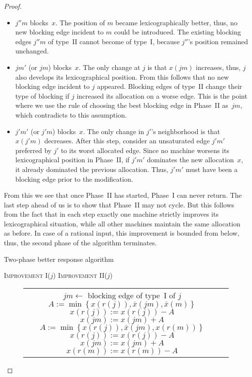 \documentclass{llncs}
\begin{document}
\begin{proof}
\begin{itemize}
	\item $j''m$ blocks~$x$. The position of $m$ became lexicographically better, thus, no new blocking edge incident to $m$ could be introduced. The existing blocking edges $j''m$ of type~II cannot become of type~I, because $j''$'s position remained unchanged.
	\item $jm'$ (or $jm$) blocks~$x$. The only change at $j$ is that $x(jm)$ increases, thus, $j$ also develops its  lexicographical position. From this follows that no new blocking edge incident to $j$ appeared. Blocking edges of type~II change their type of blocking if $j$ increased its allocation on a worse edge. This is the point where we use the rule of choosing the best blocking edge in Phase~II as~$jm$, which contradicts to this assumption.
	\item $j'm'$ (or $j'm$) blocks~$x$. The only change in $j'$'s neighborhood is that $x(j'm)$ decreases. After this step, consider an unsaturated edge $j'm'$ preferred by $j'$ to its worst allocated edge. Since no machine worsens its lexicographical position in Phase~II, if $j'm'$ dominates the new allocation~$x$, it already dominated the previous allocation. Thus, $j'm'$ must have been a blocking edge prior to the modification.  
\end{itemize}

From this we see that once Phase~II has started, Phase~I can never return. The last step ahead of us is to show that Phase~II may not cycle. But this follows from the fact that in each step exactly one machine strictly improves its lexicographical situation, while all other machines maintain the same allocation as before. In case of a rational input, this improvement is bounded from below, thus, the second phase of the algorithm terminates.

\begin{algorithm}[H]
\renewcommand{\thealgorithm}{} \caption{Two-phase better response algorithm}
\label{alg:two_ph}
\begin{algorithmic}
	\State \textsc{Improvement I}($j$)
\EndWhile
{}
	\State \textsc{Improvement II}($j$)
\EndWhile
\end{algorithmic}
\end{algorithm}


\begin{algorithmic}
\begin{figure}[H]
\centering
\begin{tabular}[H]{cc}
\begin{minipage}[t]{3.0 in}
\Procedure{Improvement I}{$j$}
	\State $jm \leftarrow$ blocking edge of type~I of $j$
	\If{$x(m) < q(m)$}
		\State  $A := \min{\left\{x(r(j)),\bar{x}(jm), \bar{x}(m)\right\}}$
		\State  $x(r(j)) := x(r(j))-A$
		\State  $x(jm) := x(jm)+A$
	\Else
		\State  $A := \min{\left\{x(r(j)),\bar{x}(jm), x(r(m))\right\}}$
		\State  $x(r(j)) := x(r(j))-A$
		\State  $x(jm) := x(jm)+A$
		\State  $x(r(m)) := x(r(m))-A$
	\EndIf
\EndProcedure
\end{minipage}&


\end{tabular}
\end{figure}
\end{algorithmic}
\end{proof}
\end{document}
